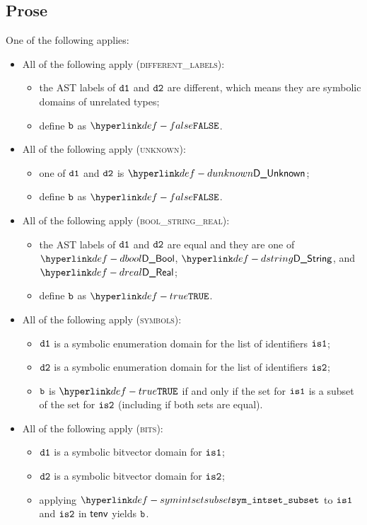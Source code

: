\subsection{Prose}
One of the following applies:
\begin{itemize}
  \item All of the following apply (\textsc{different\_labels}):
  \begin{itemize}
    \item the AST labels of $\texttt{d1}$ and $\texttt{d2}$ are different, which means they are symbolic domains of unrelated types;
    \item define $\texttt{b}$ as $\False$.
  \end{itemize}

  \item All of the following apply (\textsc{unknown}):
  \begin{itemize}
    \item one of $\texttt{d1}$ and $\texttt{d2}$ is $\DUnknown$;
    \item define $\texttt{b}$ as $\False$.
  \end{itemize}

  \item All of the following apply (\textsc{bool\_string\_real}):
  \begin{itemize}
    \item the AST labels of $\texttt{d1}$ and $\texttt{d2}$ are equal and they are one of $\DBool$, $\DString$, and $\DReal$;
    \item define $\texttt{b}$ as $\True$.
  \end{itemize}

  \item All of the following apply (\textsc{symbols}):
  \begin{itemize}
    \item $\texttt{d1}$ is a symbolic enumeration domain for the list of identifiers $\texttt{is1}$;
    \item $\texttt{d2}$ is a symbolic enumeration domain for the list of identifiers $\texttt{is2}$;
    \item $\texttt{b}$ is $\True$ if and only if the set for $\texttt{is1}$ is a subset of the set for $\texttt{is2}$ (including if both sets are equal).
  \end{itemize}

  \item All of the following apply (\textsc{bits}):
  \begin{itemize}
    \item $\texttt{d1}$ is a symbolic bitvector domain for $\texttt{is1}$;
    \item $\texttt{d2}$ is a symbolic bitvector domain for $\texttt{is2}$;
    \item applying $\symintsetsubset$ to $\texttt{is1}$ and $\texttt{is2}$ in $\textsf{tenv}$ yields $\texttt{b}$.
  \end{itemize}


\end{itemize}
